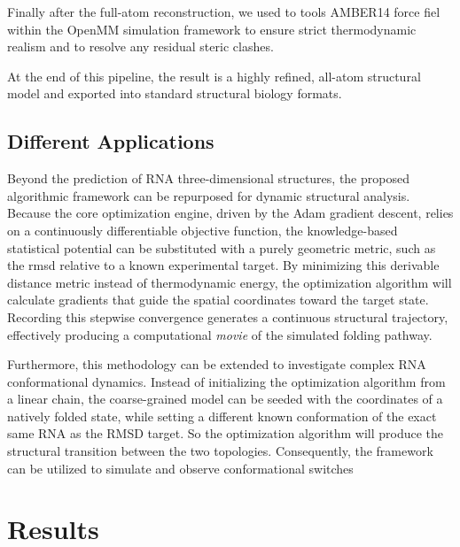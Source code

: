 \documentclass[11pt,a4paper]{article}
\begin{document}
Finally after the full-atom reconstruction, we used to tools AMBER14 \cite{amber14} force fiel within the OpenMM \cite{openmm} simulation framework to ensure strict thermodynamic realism and to resolve any residual steric clashes. 

At the end of this pipeline, the result is a highly refined, all-atom structural model and exported into standard structural biology formats.

\subsection{Different Applications}

Beyond the prediction of RNA three-dimensional structures, the proposed algorithmic framework can be repurposed for dynamic structural analysis. Because the core optimization engine, driven by the Adam gradient descent, relies on a continuously differentiable objective function, the knowledge-based statistical potential can be substituted with a purely geometric metric, such as the \acrfull{rmsd} relative to a known experimental target. By minimizing this derivable distance metric instead of thermodynamic energy, the optimization algorithm will calculate gradients that guide the spatial coordinates toward the target state. Recording this stepwise convergence generates a continuous structural trajectory, effectively producing a computational \textit{movie} of the simulated folding pathway.

Furthermore, this methodology can be extended to investigate complex RNA conformational dynamics. Instead of initializing the optimization algorithm from a linear chain, the coarse-grained model can be seeded with the coordinates of a natively folded state, while setting a different known conformation of the exact same RNA as the RMSD target. So the optimization algorithm will produce the structural transition between the two topologies. Consequently, the framework can be utilized to simulate and observe conformational switches

\newpage
\section{Results}
\end{document}
